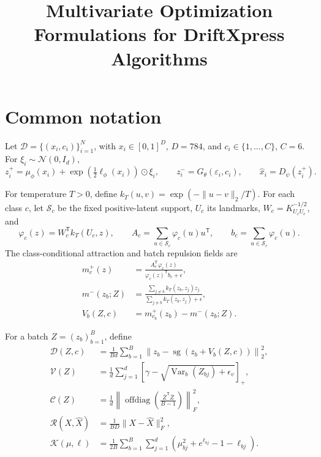 \documentclass[10pt]{article}
\title{Multivariate Optimization Formulations for DriftXpress Algorithms}
\author{}
\date{}
\newcommand{\sg}{\operatorname{sg}}
\newcommand{\offdiag}{\operatorname{offdiag}}
\begin{document}
\maketitle

\section*{Common notation}

Let $\mathcal D=\{(x_i,c_i)\}_{i=1}^N$, with $x_i\in[0,1]^D$, $D=784$, and
$c_i\in\{1,\ldots,C\}$, $C=6$.  For $\xi_i\sim\mathcal N(0,I_d)$,
\begin{equation}
 z_i^+=\mu_\phi(x_i)+\exp\!\left(\tfrac12\ell_\phi(x_i)\right)\odot\xi_i,
 \qquad
 z_i^-=G_\theta(\varepsilon_i,c_i),
 \qquad
 \widehat x_i=D_\psi(z_i^+).
\end{equation}

For temperature $T>0$, define $k_T(u,v)=\exp(-\lVert u-v\rVert_2/T)$.  For each
class $c$, let $\mathcal S_c$ be the fixed positive-latent support, $U_c$ its
landmarks, $W_c=K_{U_cU_c}^{-1/2}$, and
\begin{equation}
 \varphi_c(z)=W_c^{\mathsf T}k_T(U_c,z),\qquad
 A_c=\sum_{u\in\mathcal S_c}\varphi_c(u)u^{\mathsf T},\qquad
 b_c=\sum_{u\in\mathcal S_c}\varphi_c(u).
\end{equation}
The class-conditional attraction and batch repulsion fields are
\begin{align}
 m_c^+(z)&=\frac{A_c^{\mathsf T}\varphi_c(z)}{\varphi_c(z)^{\mathsf T}b_c+\epsilon},\\
 m^-(z_b;Z)&=\frac{\sum_{j\neq b}k_T(z_b,z_j)z_j}
 {\sum_{j\neq b}k_T(z_b,z_j)+\epsilon},\\
 V_b(Z,c)&=m_{c_b}^+(z_b)-m^-(z_b;Z).
\end{align}

For a batch $Z=(z_b)_{b=1}^B$, define
\begin{align}
 \mathcal D(Z,c)
 &=\frac{1}{Bd}\sum_{b=1}^B
 \left\lVert z_b-\sg\!\left(z_b+V_b(Z,c)\right)\right\rVert_2^2,\\
 \mathcal V(Z)&=\frac1d\sum_{j=1}^d
 \left[\gamma-\sqrt{\operatorname{Var}_b(Z_{bj})+\epsilon_v}\right]_+,\\
 \mathcal C(Z)&=\frac1d\left\lVert\offdiag\!\left(
 \frac{\bar Z^{\mathsf T}\bar Z}{B-1}\right)\right\rVert_F^2,\\
 \mathcal R(X,\widehat X)&=\frac{1}{BD}\lVert X-\widehat X\rVert_F^2,\\
 \mathcal K(\mu,\ell)&=\frac{1}{2B}\sum_{b=1}^B\sum_{j=1}^d
 \left(\mu_{bj}^2+e^{\ell_{bj}}-1-\ell_{bj}\right).
\end{align}
\end{document}
